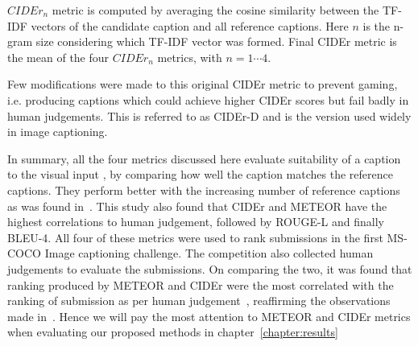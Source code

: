 $CIDEr_n$ metric is computed by averaging the cosine similarity between
the TF-IDF vectors of the candidate caption and all reference captions.
Here $n$ is the n-gram size considering which TF-IDF vector was formed.
Final CIDEr metric is the mean of the four $CIDEr_n$ metrics, with $n=1\cdots4$.

Few modifications were made to this original CIDEr metric to prevent gaming,
i.e.  producing captions which could achieve higher CIDEr scores but fail badly
in human judgements.
This is referred to as CIDEr-D and is the version used widely in image
captioning.


In summary, all the four metrics discussed here evaluate suitability of a
caption to the visual input , by comparing how well the caption matches the
reference captions.
They perform better with the increasing number of reference captions as was
found in~\cite{Vedantam_2015_CVPR}.
This study also found that CIDEr and METEOR have the highest correlations to
human judgement, followed by ROUGE-L and finally BLEU-4.
All four of these metrics were used to rank submissions in the first MS-COCO
Image captioning challenge.
The competition also collected human judgements to evaluate the submissions.
%
On comparing the two, it was found that ranking produced by METEOR and CIDEr
were the most correlated with the ranking of submission as per human
judgement~\cite{lsun2015CaptionSlides}, reaffirming the observations
made in~\cite{Vedantam_2015_CVPR}.
Hence we will pay the most attention to METEOR and CIDEr metrics when evaluating
our proposed methods in chapter~\ref{chapter:results}
